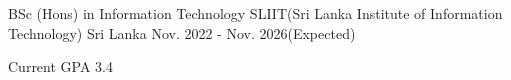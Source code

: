 

\begin{cventries}

  \cventry
    {BSc (Hons) in Information Technology} %
    {SLIIT(Sri Lanka Institute of Information Technology)} %
    {Sri Lanka} %
    {Nov. 2022 - Nov. 2026(Expected)} %
    {
      \begin{cvitems} %
        \item {Current GPA 3.4}
      \end{cvitems}
    }

\end{cventries}
